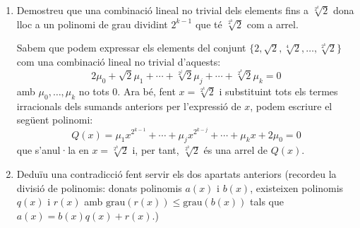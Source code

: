 \documentclass[11pt,a4paper]{article}
\begin{document}
\begin{enumerate}
\begin{enumerate}
\begin{enumerate}
            \item Demostreu que una combinació lineal no trivial dels elements fins a $\sqrt[2^k]{2}$ dona lloc a un polinomi de grau dividint $2^{k-1}$ que té $\sqrt[2^k]{2}$ com a arrel.\par
            Sabem que podem expressar els elements del conjunt $\{2,\sqrt{2},\sqrt[4]{2},\ldots,\sqrt[2^k]{2}\}$ com una combinació lineal no trivial d'aquests:
            \begin{equation*}
                2\mu_0+\sqrt{2}\mu_1+\cdots+\sqrt[2^j]{2}\mu_j+\cdots+\sqrt[2^k]{2}\mu_k=0
            \end{equation*}
            amb $\mu_0,\ldots,\mu_k$ no tots 0. Ara bé, fent $x=\sqrt[2^k]{2}$ i substituint tots els termes irracionals dels sumands anteriors per l'expressió de $x$, podem escriure el següent polinomi:
            \begin{equation*}
                Q(x)=\mu_1x^{2^{k-1}}+\cdots+\mu_jx^{2^{k-j}}+\cdots+\mu_kx+2\mu_0=0
            \end{equation*}
            que s'anul·la en $x=\sqrt[2^k]{2}$ i, per tant, $\sqrt[2^k]{2}$ és una arrel de $Q(x)$.
            \item Deduïu una contradicció fent servir els dos apartats anteriors (recordeu la divisió de polinomis: donats polinomis $a(x)$ i $b(x)$, existeixen polinomis $q(x)$ i $r(x)$ amb $\text{grau}(r(x))\leq \text{grau}(b(x))$ tals que $a(x) = b(x)q(x) + r(x)$.)\par
        \end{enumerate}
    \end{enumerate}
\end{enumerate}
\end{document}
